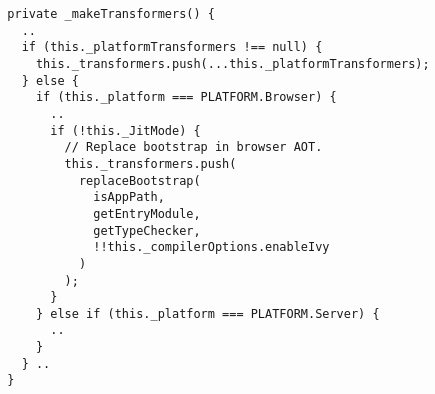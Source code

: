 \begin{verbatim}
  private _makeTransformers() {
    ..
    if (this._platformTransformers !== null) {
      this._transformers.push(...this._platformTransformers);
    } else {
      if (this._platform === PLATFORM.Browser) {
        ..
        if (!this._JitMode) {
          // Replace bootstrap in browser AOT.
          this._transformers.push(
            replaceBootstrap(
              isAppPath,
              getEntryModule,
              getTypeChecker,
              !!this._compilerOptions.enableIvy
            )
          );
        }
      } else if (this._platform === PLATFORM.Server) {
        ..
      }
    } ..
  }
\end{verbatim}
